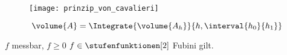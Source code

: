 \begin{bemerkung}\label{prinzip_von_cavalieri}
  \begin{figure}[H]
    \centering
    \texttt{[image: prinzip\_von\_cavalieri]}
    \label{fig:prinzip_von_cavalieri}
  \end{figure}
  \begin{equation*}
    \volume{A}=\Integrate{\volume{A_h}}{h,\interval{h_0}{h_1}}
  \end{equation*}
\end{bemerkung}
\begin{bemerkung}
  \( f \) messbar, \( f\geq 0 \) \timplies \( f\in \stufenfunktionen[2] \) \timplies Fubini gilt.
\end{bemerkung}